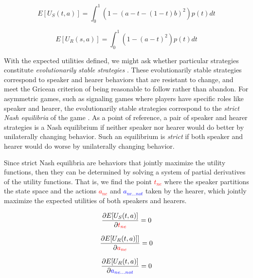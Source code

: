 \documentclass[linguex]{sp}
\theoremstyle{definition} \newtheorem{definition}{Definition}
\begin{document}
\begin{equation}
     E[U_S(t, a)] = \int_0^1 \left( 1 -(a - t - (1-t)b)^2 \right)p(t)dt
\end{equation}

\begin{equation}
      E[U_R(s, a)] = \int_0^1 \left( 1 -(a - t)^2 \right) p(t) dt
\end{equation}

With the expected utilities defined, we might ask whether particular strategies constitute \emph{evolutionarily stable strategies} \citep{maynard-smith1982}. These evolutionarily stable strategies correspond to speaker and hearer behaviors that are resistant to change, and meet the Gricean \citeyearpar[29]{grice1975} criterion of being reasonable to follow rather than abandon. For asymmetric games, such as signaling games where players have specific roles like speaker and hearer, the evolutionarily stable strategies correspond to the \emph{strict Nash equilibria} of the game \citep{selten:1980}.  As a point of reference, a pair of speaker and hearer strategies is a Nash equilibrium if neither speaker nor hearer would do better by unilaterally changing behavior. Such an equilibrium is \emph{strict} if both speaker and hearer would do worse by unilaterally changing behavior.  

Since strict Nash equilibria are behaviors that jointly maximize the utility functions, then they can be determined by solving a system of partial derivatives of the utility functions. That is, we find the point \emph{\textcolor{red}{$t_{ne}$}} where the speaker partitions the state space and the actions \emph{\textcolor{red}{$a_{ne}$}} and \emph{\textcolor{blue}{$a_{ne...not}$}} taken by the hearer, which jointly maximize the expected utilities of both speakers and hearers.

\begin{equation}
	\frac{\partial E[U_S(t, a)]}{\partial \emph{\textcolor{red}{$t_{ne}$}}} =  0 \\
\end{equation}


\begin{equation}
	\frac{\partial E[U_R(t, a)]]}{\partial \emph{\textcolor{red}{$a_{ne}$}}} = 0 \\
\end{equation}


\begin{equation}
	\frac{\partial E[U_R(t, a)]}{\partial \emph{\textcolor{blue}{$a_{ne...not}$}}} = 0
\end{equation}
\end{document}
